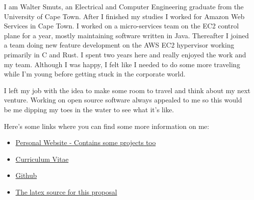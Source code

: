 I am Walter Smuts, an Electrical and Computer Engineering graduate from the
University of Cape Town. After I finished my studies I worked for Amazon Web
Services in Cape Town. I worked on a micro-services team on the EC2 control plane
for a year, mostly maintaining software written in Java. Thereafter I joined a
team doing new feature development on the AWS EC2 hypervisor working primarily in
C and Rust. I spent two years here and really enjoyed the work and my team.
Although I  was happy, I felt like I needed to do some more traveling while I'm
young before getting stuck in the corporate world.

I left my job with the idea to make some room to travel and think about my next
venture. Working on open source software always appealed to me so this would be me
dipping my toes in the water to see what it's like.

Here's some links where you can find some more information on me:
\begin{itemize}
\setlength\itemsep{-0.1em}
\item \href{https://www.waltersmuts.com}{Personal Website - Contains some projects too}
\item \href{https://www.waltersmuts.com/Walter\%20Smuts\%20-\%20Curriculum\%20Vitae.pdf}{Curriculum Vitae}
\item \href{https://github.com/WalterSmuts}{Github}
\item \href{https://github.com/WalterSmuts/2022-summer-of-code-proposals}{The latex source for this proposal}
\end{itemize}
